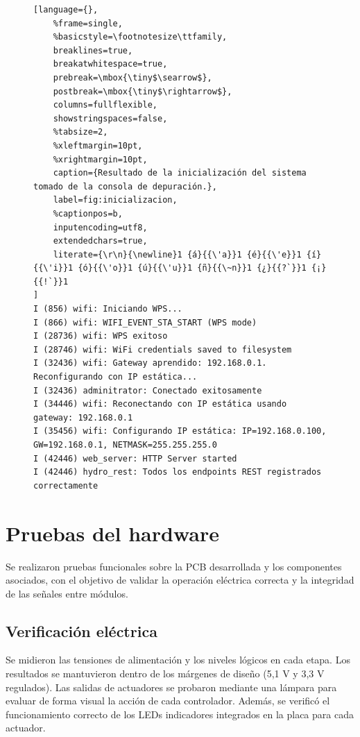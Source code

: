 \begin{figure}[H]
\centering
\begin{minipage}{\textwidth}
\begin{lstlisting}[language={},
    %frame=single,
    %basicstyle=\footnotesize\ttfamily,
    breaklines=true,
    breakatwhitespace=true,
    prebreak=\mbox{\tiny$\searrow$},
    postbreak=\mbox{\tiny$\rightarrow$},
    columns=fullflexible,
    showstringspaces=false,
    %tabsize=2,
    %xleftmargin=10pt,
    %xrightmargin=10pt,
    caption={Resultado de la inicialización del sistema tomado de la consola de depuración.},
    label=fig:inicializacion,
    %captionpos=b,
    inputencoding=utf8,
    extendedchars=true,
    literate={\r\n}{\newline}1 {á}{{\'a}}1 {é}{{\'e}}1 {í}{{\'i}}1 {ó}{{\'o}}1 {ú}{{\'u}}1 {ñ}{{\~n}}1 {¿}{{?`}}1 {¡}{{!`}}1
]
I (856) wifi: Iniciando WPS...
I (866) wifi: WIFI_EVENT_STA_START (WPS mode)
I (28736) wifi: WPS exitoso
I (28746) wifi: WiFi credentials saved to filesystem
I (32436) wifi: Gateway aprendido: 192.168.0.1. Reconfigurando con IP estática...
I (32436) adminitrator: Conectado exitosamente
I (34446) wifi: Reconectando con IP estática usando gateway: 192.168.0.1
I (35456) wifi: Configurando IP estática: IP=192.168.0.100, GW=192.168.0.1, NETMASK=255.255.255.0
I (42446) web_server: HTTP Server started
I (42446) hydro_rest: Todos los endpoints REST registrados correctamente
\end{lstlisting}
\end{minipage}
\end{figure}


\section{Pruebas del hardware}

Se realizaron pruebas funcionales sobre la PCB desarrollada y los componentes asociados, con el objetivo de validar la operación eléctrica correcta y la integridad de las señales entre módulos.

\subsection{Verificación eléctrica}
Se midieron las tensiones de alimentación y los niveles lógicos en cada etapa. Los resultados se mantuvieron dentro de los márgenes de diseño (5,1 V y 3,3 V regulados).  
Las salidas de actuadores se probaron mediante una lámpara para evaluar de forma visual la acción de cada controlador. Además, se verificó el funcionamiento correcto de los LEDs indicadores integrados en la placa para cada actuador.

